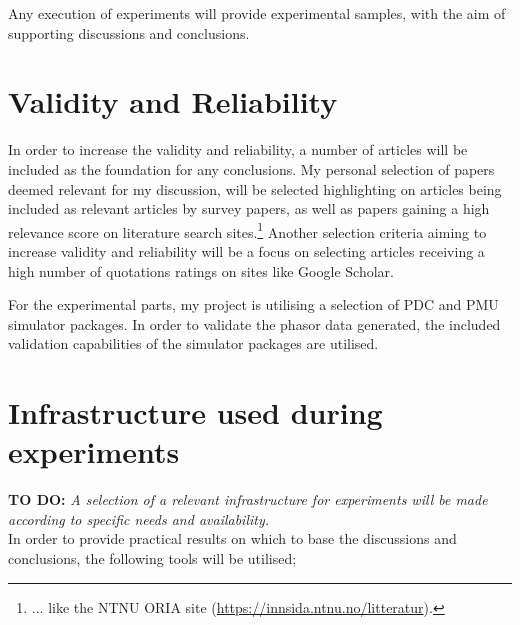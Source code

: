 Any execution of experiments will provide experimental samples, with the aim of supporting discussions and conclusions.
\section{Validity and Reliability}

In order to increase the validity and reliability, a number of articles will be included as the foundation for any conclusions. My personal selection of papers deemed relevant for my discussion, will be selected highlighting on articles being included as relevant articles by survey papers, as well as papers gaining a high relevance score on literature search sites.\footnote{... like the NTNU ORIA site (\url{https://innsida.ntnu.no/litteratur}).} Another selection criteria aiming to increase validity and reliability will be a focus on selecting articles receiving a high number of quotations ratings on sites like Google Scholar. %



For the experimental parts, my project is utilising a selection of PDC and PMU simulator packages. In order to validate the phasor data generated, the included validation capabilities of the simulator packages are utilised.

\section{Infrastructure used during experiments }
\textbf{TO DO:}
\textit{A selection of a relevant infrastructure for experiments will be made according to  specific needs and availability.  }\\ 

In order to provide practical results on which to base the discussions and conclusions, the following tools will be utilised;

